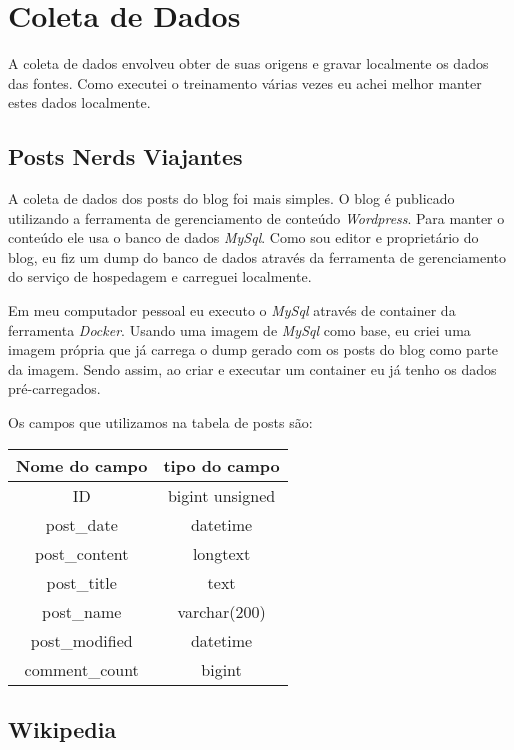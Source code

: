 \section{Coleta de Dados}

A coleta de dados envolveu obter de suas origens e gravar localmente os dados das fontes. Como executei o treinamento várias vezes eu achei 
melhor manter estes dados localmente.

\subsection{Posts Nerds Viajantes}

A coleta de dados dos posts do blog foi mais simples. O blog é publicado utilizando a ferramenta de gerenciamento de conteúdo \textit{Wordpress}. Para manter 
o conteúdo ele usa o banco de dados \textit{MySql}. Como sou editor e proprietário do blog, eu fiz um dump do banco de dados através da ferramenta de 
gerenciamento do serviço de hospedagem e carreguei localmente.

Em meu computador pessoal eu executo o \textit{MySql} através de container da ferramenta \textit{Docker}. Usando uma imagem de \textit{MySql} como base, eu criei uma imagem própria 
que já carrega o dump gerado com os posts do blog como parte da imagem. Sendo assim, ao criar e executar um container eu já tenho os dados pré-carregados.

Os campos que utilizamos na tabela de posts são:

\begin{center}
    \begin{tabular}{ |c|c| }
        \hline
        \textbf{Nome do campo} & \textbf{tipo do campo} \\
        \hline
        ID & bigint unsigned \\
        \hline
        post\_date & datetime \\
        \hline
        post\_content & longtext \\
        \hline
        post\_title & text \\
        \hline
        post\_name & varchar(200) \\
        \hline
        post\_modified & datetime \\
        \hline
        comment\_count & bigint \\
        \hline
    \end{tabular}
\end{center}

\subsection{Wikipedia}

